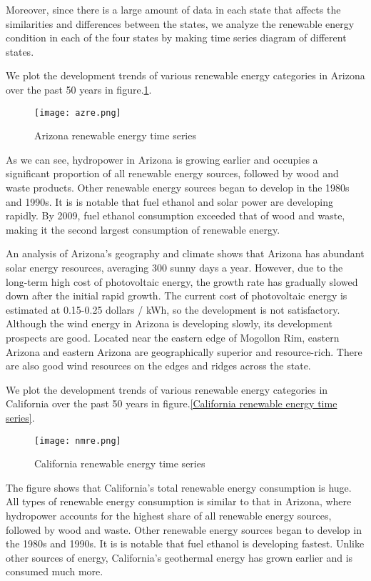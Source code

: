 \documentclass{mcmthesis}
\begin{document}
Moreover, since there is a large amount of data in each state that affects the similarities and differences between the states, we analyze the renewable energy condition in each of the four states by making time series diagram of different states.

We plot the development trends of various renewable energy categories in Arizona over the past 50 years in figure.\ref{fig: Arizona renewable energy time series}.
\begin{figure}[htb]
  \centering
  \texttt{[image: azre.png]}
  \caption{Arizona renewable energy time series} \label{fig: Arizona renewable energy time series}
\end{figure}

As we can see, hydropower in Arizona is growing earlier and occupies a significant proportion of all renewable energy sources, followed by wood and waste products. Other renewable energy sources began to develop in the 1980s and 1990s. It is is notable that fuel ethanol and solar power are developing rapidly. By 2009, fuel ethanol consumption exceeded that of wood and waste, making it the second largest consumption of renewable energy.

An analysis of Arizona's geography and climate shows that Arizona has abundant solar energy resources, averaging 300 sunny days a year. However, due to the long-term high cost of photovoltaic energy, the growth rate has gradually slowed down after the initial rapid growth. The current cost of photovoltaic energy is estimated at 0.15-0.25 dollars / kWh, so the development is not satisfactory.\cite{AZretime}
Although the wind energy in Arizona is developing slowly, its development prospects are good. Located near the eastern edge of Mogollon Rim, eastern Arizona and eastern Arizona are geographically superior and resource-rich. There are also good wind resources on the edges and ridges across the state.\cite{AZwind}

We plot the development trends of various renewable energy categories in California over the past 50 years in figure.\ref{California renewable energy time series}.
\begin{figure}[htb]
  \centering
  \texttt{[image: nmre.png]}
  \caption{California renewable energy time series} \label{fig: California renewable energy time series}
\end{figure}

The figure shows that California's total renewable energy consumption is huge. All types of renewable energy consumption is similar to that in Arizona, where hydropower accounts for the highest share of all renewable energy sources, followed by wood and waste. Other renewable energy sources began to develop in the 1980s and 1990s. It is is notable that fuel ethanol is developing fastest. Unlike other sources of energy, California's geothermal energy has grown earlier and is consumed much more.
\end{document}
